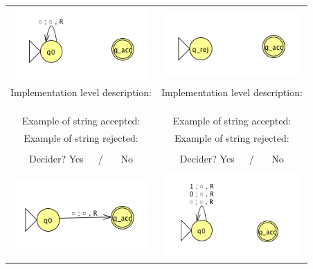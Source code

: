 \documentclass[12pt, oneside]{article}
\begin{document}
  
  \begin{center}
  \begin{tabular}{|c|c|}
  \hline
  \hspace{0.8in}\includegraphics[width=2in]{../../resources/machines/Lect14TM1.png} \phantom{\hspace{0.8in}}&\hspace{0.8in} \includegraphics[width=2in]{../../resources/machines/Lect14TM2.png} \phantom{\hspace{0.8in}}\\
  Implementation  level description:  \phantom{\hspace{1in}} &Implementation  level description:  \phantom{\hspace{1in}} \\
  &\\
  &\\
  &\\
  Example of string accepted: \phantom{\hspace{1.5in}}& Example of string accepted: \phantom{\hspace{1.5in}}\\
  Example of string rejected: \phantom{\hspace{1.5in}}& Example of string  rejected: \phantom{\hspace{1.5in}}\\
  &\\
  Decider? Yes~~~/ ~~~No
  &Decider? Yes~~~/ ~~~No\\
  & \\
  \hline
  \includegraphics[width=2in]{../../resources/machines/Lect14TM3.png} & \includegraphics[width=2in]{../../resources/machines/Lect14TM4.png} \\

\end{tabular}
\end{center}
\end{document}

